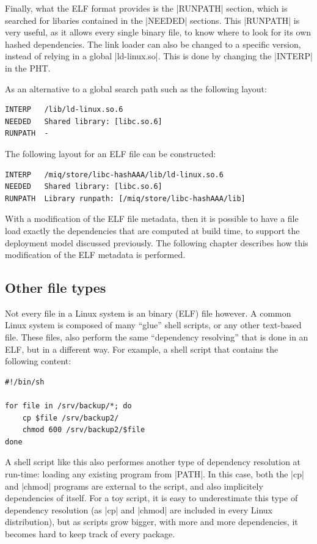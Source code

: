 Finally, what the ELF format provides is the |RUNPATH|
section, which is searched for libaries contained in the
|NEEDED| sections. This |RUNPATH| is very useful, as it
allows every single binary file, to know where to look for
its own hashed dependencies. The link loader can also be
changed to a specific version, instead of relying in a
global |ld-linux.so|. This is done by changing the
|INTERP| in the \ac{PHT}.


As an alternative to a global search path such as the
following layout:

\begin{verbatim}
INTERP   /lib/ld-linux.so.6
NEEDED   Shared library: [libc.so.6]
RUNPATH  -
\end{verbatim}

The following layout for an ELF file can be constructed:

\begin{verbatim}
INTERP   /miq/store/libc-hashAAA/lib/ld-linux.so.6
NEEDED   Shared library: [libc.so.6]
RUNPATH  Library runpath: [/miq/store/libc-hashAAA/lib]
\end{verbatim}

With a modification of the ELF file metadata, then it is
possible to have a file load exactly the dependencies that
are computed at build time, to support the deployment model
discussed previously. The following chapter describes how
this modification of the ELF metadata is performed.

\FloatBarrier
\subsection{Other file types}

Not every file in a Linux system is an binary (ELF) file
however. A common Linux system is composed of many ``glue''
shell scripts, or any other text-based file. These files,
also perform the same ``dependency resolving'' that is done
in an ELF, but in a different way. For example, a shell
script that contains the following content:

\begin{verbatim}
#!/bin/sh

for file in /srv/backup/*; do
    cp $file /srv/backup2/
    chmod 600 /srv/backup2/$file
done
\end{verbatim}

A shell script like this also performes another type of
dependency resolution at run-time: loading any existing
program from |PATH|. In this case, both the |cp| and |chmod|
programs are external to the script, and also implicitely
dependencies of itself. For a toy script, it is easy to
underestimate this type of dependency resolution (as |cp|
and |chmod| are included in every Linux distribution), but
as scripts grow bigger, with more and more dependencies, it
becomes hard to keep track of every package.

